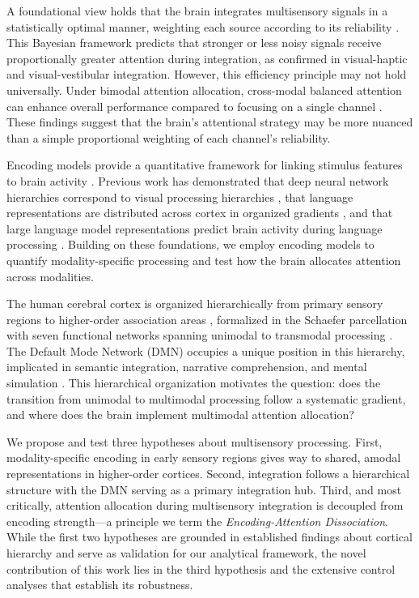 \documentclass[conference]{IEEEtran}
\begin{document}
A foundational view holds that the brain integrates multisensory signals in a statistically optimal manner, weighting each source according to its reliability \cite{ernst2002humans, knill2004bayesian}. This Bayesian framework predicts that stronger or less noisy signals receive proportionally greater attention during integration, as confirmed in visual-haptic \cite{ernst2002humans} and visual-vestibular \cite{fetsch2013bridging} integration. However, this efficiency principle may not hold universally. Under bimodal attention allocation, cross-modal balanced attention can enhance overall performance compared to focusing on a single channel \cite{mishra2012attention}. These findings suggest that the brain's attentional strategy may be more nuanced than a simple proportional weighting of each channel's reliability.

Encoding models provide a quantitative framework for linking stimulus features to brain activity \cite{naselaris2011encoding}. Previous work has demonstrated that deep neural network hierarchies correspond to visual processing hierarchies \cite{gucclu2015deep}, that language representations are distributed across cortex in organized gradients \cite{huth2016natural}, and that large language model representations predict brain activity during language processing \cite{caucheteux2022brains}. Building on these foundations, we employ encoding models to quantify modality-specific processing and test how the brain allocates attention across modalities.

The human cerebral cortex is organized hierarchically from primary sensory regions to higher-order association areas \cite{margulies2016situating}, formalized in the Schaefer parcellation with seven functional networks spanning unimodal to transmodal processing \cite{schaefer2018local}. The Default Mode Network (DMN) occupies a unique position in this hierarchy, implicated in semantic integration, narrative comprehension, and mental simulation \cite{mar2011neural, simony2016dynamic}. This hierarchical organization motivates the question: does the transition from unimodal to multimodal processing follow a systematic gradient, and where does the brain implement multimodal attention allocation?

We propose and test three hypotheses about multisensory processing. First, modality-specific encoding in early sensory regions gives way to shared, amodal representations in higher-order cortices. Second, integration follows a hierarchical structure with the DMN serving as a primary integration hub. Third, and most critically, attention allocation during multisensory integration is decoupled from encoding strength---a principle we term the \textit{Encoding-Attention Dissociation}. While the first two hypotheses are grounded in established findings about cortical hierarchy \cite{margulies2016situating} and serve as validation for our analytical framework, the novel contribution of this work lies in the third hypothesis and the extensive control analyses that establish its robustness.
\end{document}
